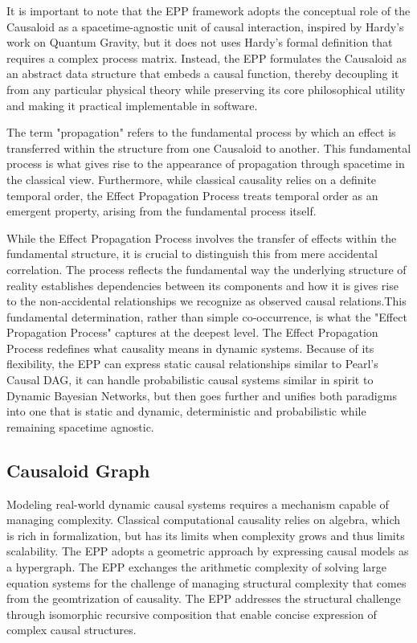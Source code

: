 It is important to note that the EPP framework adopts the conceptual role of the Causaloid as a spacetime-agnostic unit of causal interaction, inspired by Hardy’s work on Quantum Gravity, but it does not uses Hardy's formal definition that requires a complex process matrix.  Instead, the EPP formulates the Causaloid as an abstract data structure that embeds a causal function, thereby decoupling it from any particular physical theory while preserving its core philosophical utility and making it practical implementable in software.

The term "propagation" refers to the fundamental process by which an effect is transferred within the structure from one Causaloid to another. This fundamental process is what gives rise to the appearance of propagation through spacetime in the classical view. Furthermore, while classical causality relies on a definite temporal order, the Effect Propagation Process treats temporal order as an emergent property, arising from the fundamental process itself.

While the Effect Propagation Process involves the transfer of effects within the fundamental structure, it is crucial to distinguish this from mere accidental correlation. The process reflects the fundamental way the underlying structure of reality establishes dependencies between its components and how it is gives rise to the non-accidental relationships we recognize as observed causal relations.This fundamental determination, rather than simple co-occurrence, is what the "Effect Propagation Process" captures at the deepest level. The Effect Propagation Process redefines what causality means in dynamic systems. Because of its flexibility, the EPP can express static causal relationships similar to Pearl’s Causal DAG, it can handle probabilistic causal systems similar in spirit to Dynamic Bayesian Networks, but then goes further and unifies both paradigms into one that is static and dynamic, deterministic and probabilistic while remaining spacetime agnostic. 

\newpage

\subsection{Causaloid Graph}
\label{sec:epp_causaloid_graph}

Modeling real-world dynamic causal systems requires a mechanism capable of managing complexity.
Classical computational causality relies on algebra, which is rich in formalization,
but has its limits when complexity grows and thus limits scalability. The EPP adopts 
a geometric approach by expressing causal models as a hypergraph. The EPP
exchanges the arithmetic complexity of solving large equation systems for the challenge of managing structural complexity that comes from the geomtrization of causality.
The EPP addresses the structural challenge through isomorphic recursive composition 
that enable concise expression of complex causal structures. 

